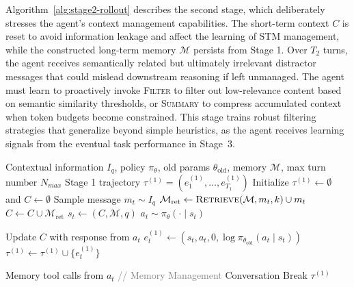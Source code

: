 Algorithm~\ref{alg:stage2-rollout} describes the second stage, which deliberately stresses the agent's context management capabilities. The short-term context $C$ is reset to avoid information leakage and affect the learning of STM management, while the constructed long-term memory $\mathcal{M}$ persists from Stage 1. Over $T_2$ turns, the agent receives semantically related but ultimately irrelevant distractor messages that could mislead downstream reasoning if left unmanaged. The agent must learn to proactively invoke \textsc{Filter} to filter out low-relevance content based on semantic similarity thresholds, or \textsc{Summary} to compress accumulated context when token budgets become constrained. This stage trains robust filtering strategies that generalize beyond simple heuristics, as the agent receives learning signals from the eventual task performance in Stage~3.





\begin{algorithm}[t]
\caption{Stage 1: LTM Construction}
\label{alg:stage1-rollout}
\begin{algorithmic}[1]
\Require Contextual information $I_q$, policy $\pi_{\theta}$, old params $\theta_{\text{old}}$, memory $\mathcal{M}$, max turn number $N_{max}$
\Ensure Stage 1 trajectory $\tau^{(1)} = (e_1^{(1)}, \ldots, e_{T_1}^{(1)})$
\State Initialize $\tau^{(1)} \gets \emptyset$ and $C \gets \emptyset$
    \State Sample message $m_t \sim I_q$
    \State $\mathcal{M}_{\text{ret}} \gets \textsc{Retrieve}(\mathcal{M}, m_t, k) \cup m_t$ 
    \State $C \gets C \cup \mathcal{M}_{\text{ret}}$ 
    \State $s_t \gets (C, \mathcal{M}, q)$
    \State $a_t \sim \pi_{\theta}(\cdot \mid s_t)$
    
    \State Update $C$ with response from $a_t$
    \State $e_t^{(1)} \gets (s_t, a_t, 0, \log \pi_{\theta_{\text{old}}}(a_t \mid s_t))$
    \State $\tau^{(1)} \gets \tau^{(1)} \cup \{e_t^{(1)}\}$

    \State Memory tool calls from $a_t$ \textcolor{gray}{// Memory Management}
        \State Conversation Break
    \EndIf
\EndFor
\State \Return $\tau^{(1)}$
\end{algorithmic}
\end{algorithm}

